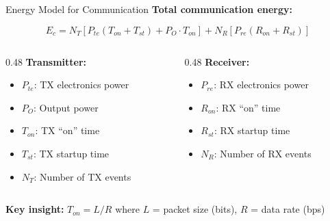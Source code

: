 \documentclass[aspectratio=169,11pt]{beamer}
\begin{document}
\begin{frame}{Energy Model for Communication}
    \textbf{Total communication energy:}
    
    \vspace{0.3cm}
    \[
    E_c = N_T \left[ P_{te}(T_{on} + T_{st}) + P_O \cdot T_{on} \right] + N_R \left[ P_{re}(R_{on} + R_{st}) \right]
    \]
    
    \vspace{0.3cm}
    \begin{columns}[T]
        \begin{column}{0.48\textwidth}
            \textbf{Transmitter:}
            \begin{itemize}
                \item $P_{te}$: TX electronics power
                \item $P_O$: Output power
                \item $T_{on}$: TX ``on'' time
                \item $T_{st}$: TX startup time
                \item $N_T$: Number of TX events
            \end{itemize}
        \end{column}
        \begin{column}{0.48\textwidth}
            \textbf{Receiver:}
            \begin{itemize}
                \item $P_{re}$: RX electronics power
                \item $R_{on}$: RX ``on'' time
                \item $R_{st}$: RX startup time
                \item $N_R$: Number of RX events
            \end{itemize}
        \end{column}
    \end{columns}
    
    \vspace{0.3cm}
    \textbf{Key insight:} $T_{on} = L / R$ where $L$ = packet size (bits), $R$ = data rate (bps)
\end{frame}
\end{document}
